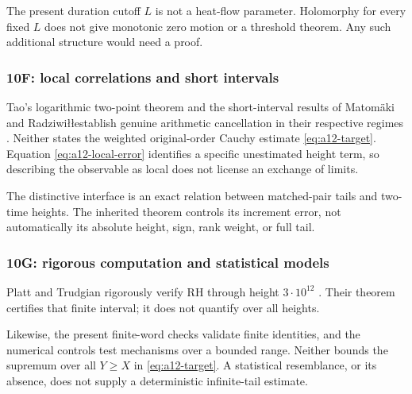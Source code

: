 \documentclass[11pt]{amsart}
\numberwithin{equation}{section}
\theoremstyle{plain}
\theoremstyle{definition}
\theoremstyle{remark}
\begin{document}
The present duration cutoff $L$ is not a heat-flow parameter.
Holomorphy for every fixed $L$ does not give monotonic zero motion or a
threshold theorem. Any such additional structure would need a proof.

\subsubsection{10F: local correlations and short intervals}
\label{subsubsec:a12-lit-local}
Tao's logarithmic two-point theorem and the short-interval results of
Matom\"aki and Radziwi\l\l establish genuine arithmetic cancellation in
their respective regimes \cite{Tao2016,MatomakiRadziwill2016}.
Neither states the weighted original-order Cauchy estimate
\eqref{eq:a12-target}. Equation \eqref{eq:a12-local-error} identifies
a specific unestimated height term, so describing the observable as local
does not license an exchange of limits.

The distinctive interface is an exact relation between matched-pair tails
and two-time heights. The inherited theorem controls its increment error,
not automatically its absolute height, sign, rank weight, or full tail.

\subsubsection{10G: rigorous computation and statistical models}
\label{subsubsec:a12-lit-numerics}
Platt and Trudgian rigorously verify RH through height $3\cdot10^{12}$
\cite{PlattTrudgian2021}. Their theorem certifies that finite interval; it
does not quantify over all heights.

Likewise, the present finite-word checks validate finite identities, and
the numerical controls test mechanisms over a bounded range. Neither
bounds the supremum over all $Y\ge X$ in \eqref{eq:a12-target}.
A statistical resemblance, or its absence, does not supply a
deterministic infinite-tail estimate.
\end{document}
